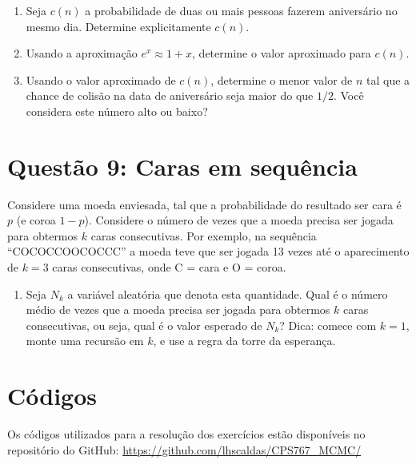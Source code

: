 \documentclass[12 pt]{article}
\begin{document}
\begin{enumerate}
    \item Seja $c(n)$ a probabilidade de duas ou mais pessoas fazerem aniversário no mesmo dia. Determine explicitamente $c(n)$.
    \begin{tcolorbox}[colframe=black, title=Resposta:]

    \end{tcolorbox}
    \item Usando a aproximação $e^x \approx 1 + x$, determine o valor aproximado para $c(n)$.
    \begin{tcolorbox}[colframe=black, title=Resposta:]

    \end{tcolorbox}
    \item Usando o valor aproximado de $c(n)$, determine o menor valor de $n$ tal que a chance de colisão na data de aniversário seja maior do que $1/2$. Você considera este número alto ou baixo?
    \begin{tcolorbox}[colframe=black, title=Resposta:]

    \end{tcolorbox}
\end{enumerate}

\section*{Questão 9: Caras em sequência}
Considere uma moeda enviesada, tal que a probabilidade do resultado ser cara é $p$ (e coroa $1 - p$).
Considere o número de vezes que a moeda precisa ser jogada para obtermos $k$ caras consecutivas. Por exemplo, na sequência ``COCOCCOOCOCCC'' a moeda teve que ser jogada 13 vezes até o aparecimento de $k = 3$ caras consecutivas, onde C = cara e O = coroa.


\begin{enumerate}
    \item Seja $N_k$ a variável aleatória que denota esta quantidade. Qual é o número médio de vezes que a moeda precisa ser jogada para obtermos $k$ caras consecutivas, ou seja, qual é o valor esperado de $N_k$? Dica: comece com $k = 1$, monte uma recursão em $k$, e use a regra da torre da esperança.
    \begin{tcolorbox}[colframe=black, title=Resposta:]

    \end{tcolorbox}
\end{enumerate}

\section*{Códigos}

Os códigos utilizados para a resolução dos exercícios estão disponíveis no repositório do GitHub: \url{https://github.com/lhscaldas/CPS767_MCMC/}

\end{document}
